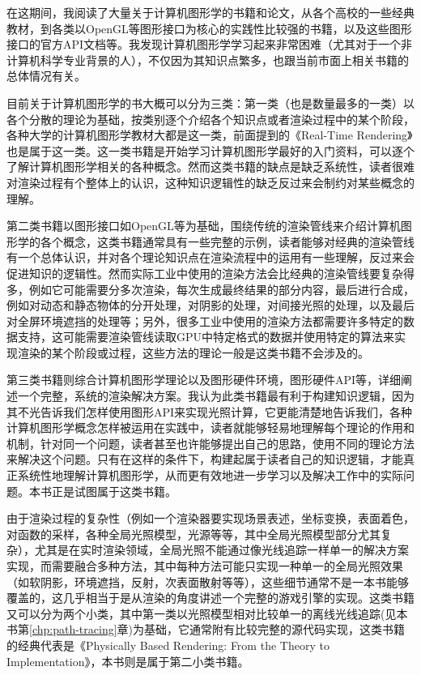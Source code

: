 在这期间，我阅读了大量关于计算机图形学的书籍和论文，从各个高校的一些经典教材，到各类以OpenGL等图形接口为核心的实践性比较强的书籍，以及这些图形接口的官方API文档等。我发现计算机图形学学习起来非常困难（尤其对于一个非计算机科学专业背景的人），不仅因为其知识点繁多，也跟当前市面上相关书籍的总体情况有关。

目前关于计算机图形学的书大概可以分为三类：第一类（也是数量最多的一类）以各个分散的理论为基础，按类别逐个介绍各个知识点或者渲染过程中的某个阶段，各种大学的计算机图形学教材大都是这一类，前面提到的《Real-Time Rendering》也是属于这一类。这一类书籍是开始学习计算机图形学最好的入门资料，可以逐个了解计算机图形学相关的各种概念。然而这类书籍的缺点是缺乏系统性，读者很难对渲染过程有个整体上的认识，这种知识逻辑性的缺乏反过来会制约对某些概念的理解。

第二类书籍以图形接口如OpenGL等为基础，围绕传统的渲染管线来介绍计算机图形学的各个概念，这类书籍通常具有一些完整的示例，读者能够对经典的渲染管线有一个总体认识，并对各个理论知识点在渲染流程中的运用有一些理解，反过来会促进知识的逻辑性。然而实际工业中使用的渲染方法会比经典的渲染管线要复杂得多，例如它可能需要分多次渲染，每次生成最终结果的部分内容，最后进行合成，例如对动态和静态物体的分开处理，对阴影的处理，对间接光照的处理，以及最后对全屏环境遮挡的处理等；另外，很多工业中使用的渲染方法都需要许多特定的数据支持，这可能需要渲染管线读取GPU中特定格式的数据并使用特定的算法来实现渲染的某个阶段或过程，这些方法的理论一般是这类书籍不会涉及的。

第三类书籍则综合计算机图形学理论以及图形硬件环境，图形硬件API等，详细阐述一个完整，系统的渲染解决方案。我认为此类书籍最有利于构建知识逻辑，因为其不光告诉我们怎样使用图形API来实现光照计算，它更能清楚地告诉我们，各种计算机图形学概念怎样被运用在实践中，读者就能够轻易地理解每个理论的作用和机制，针对同一个问题，读者甚至也许能够提出自己的思路，使用不同的理论方法来解决这个问题。只有在这样的条件下，构建起属于读者自己的知识逻辑，才能真正系统性地理解计算机图形学，从而更有效地进一步学习以及解决工作中的实际问题。本书正是试图属于这类书籍。

由于渲染过程的复杂性（例如一个渲染器要实现场景表述，坐标变换，表面着色，对函数的采样，各种全局光照模型，光源等等，其中全局光照模型部分尤其复杂），尤其是在实时渲染领域，全局光照不能通过像光线追踪一样单一的解决方案实现，而需要融合多种方法，其中每种方法可能只实现一种单一的全局光照效果（如软阴影，环境遮挡，反射，次表面散射等等），这些细节通常不是一本书能够覆盖的，这几乎相当于是从渲染的角度讲述一个完整的游戏引擎的实现。这类书籍又可以分为两个小类，其中第一类以光照模型相对比较单一的离线光线追踪(见本书第\ref{chp:path-tracing}章)为基础，它通常附有比较完整的源代码实现，这类书籍的经典代表是《Physically Based Rendering: From the Theory to Implementation》，本书则是属于第二小类书籍。

